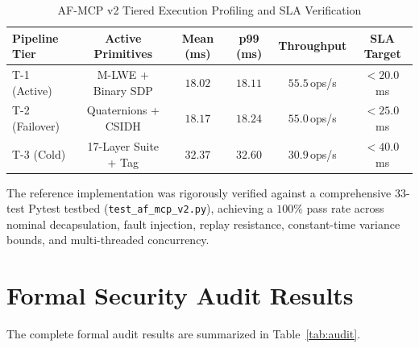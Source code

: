 \documentclass{ieeeaccess}
\begin{document}
\begin{table}[!t]
\centering
\caption{AF-MCP v2 Tiered Execution Profiling and SLA Verification}
\label{tab:af_mcp_perf}
\renewcommand{\arraystretch}{1.15}
\setlength{\tabcolsep}{2.5pt}
\footnotesize
\begin{tabular}{@{}l c c c c c@{}}
\toprule
\textbf{Pipeline Tier} & \textbf{Active Primitives} & \textbf{Mean (ms)} & \textbf{p99 (ms)} & \textbf{Throughput} & \textbf{SLA Target} \\
\midrule
T-1 (Active)   & M-LWE + Binary SDP      & $18.02$ & $18.11$ & $55.5$\,ops/s & $< 20.0$\,ms \\
T-2 (Failover) & Quaternions + CSIDH     & $18.17$ & $18.24$ & $55.0$\,ops/s & $< 25.0$\,ms \\
T-3 (Cold)     & 17-Layer Suite + Tag    & $32.37$ & $32.60$ & $30.9$\,ops/s & $< 40.0$\,ms \\
\bottomrule
\end{tabular}
\end{table}

The reference implementation was rigorously verified against a comprehensive 33-test Pytest testbed (\texttt{test\_af\_mcp\_v2.py}), achieving a $100\%$ pass rate across nominal decapsulation, fault injection, replay resistance, constant-time variance bounds, and multi-threaded concurrency.

\section{Formal Security Audit Results}
\label{sec:audit}

The complete formal audit results are summarized in Table~\ref{tab:audit}.
\end{document}
